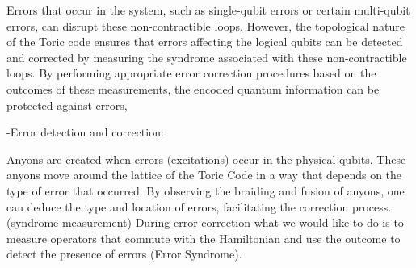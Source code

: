 \documentclass[12pt]{report}
\begin{document}
	\begin{minipage}{1 \textwidth}
		
		
		
		
		Errors that occur in the system, such as single-qubit errors or certain multi-qubit errors, can disrupt these non-contractible loops. However, the topological nature of the Toric code ensures that errors affecting the logical qubits can be detected and corrected by measuring the syndrome associated with these non-contractible loops. By performing appropriate error correction procedures based on the outcomes of these measurements, the encoded quantum information can be protected against errors, \newline
		
		-Error detection and correction:\newline
		
		Anyons are created when errors (excitations) occur in the physical qubits. These anyons move around the lattice of the Toric Code in a way that depends on the type of error that occurred. \newline
		By observing the braiding and fusion of anyons, one can deduce the type and location of errors, facilitating the correction process. (syndrome measurement)  
		During error-correction what we would like to do is to measure operators that commute with the Hamiltonian and use the outcome to detect the presence of errors (Error Syndrome). \newline
		

\end{minipage}
\end{document}
